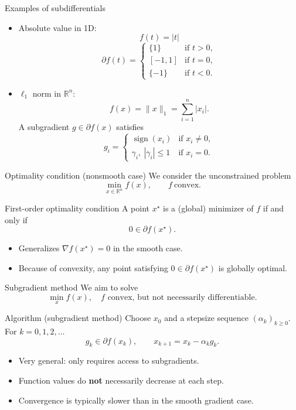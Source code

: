 \documentclass[aspectratio=169]{beamer}
\begin{document}
\begin{frame}{Examples of subdifferentials}
\begin{itemize}
    \item Absolute value in 1D:
    \[
    f(t) = |t|
    \]
    \[
    \partial f(t) =
    \begin{cases}
        \{1\}  & \text{if } t>0,\\
        [-1,1] & \text{if } t=0,\\
        \{-1\} & \text{if } t<0.
    \end{cases}
    \]
    \item $\ell_1$ norm in $\mathbb{R}^n$:
    \[
    f(x) = \|x\|_1 = \sum_{i=1}^n |x_i|.
    \]
    A subgradient $g\in\partial f(x)$ satisfies
    \[
    g_i =
    \begin{cases}
        \operatorname{sign}(x_i) & \text{if } x_i\neq 0,\\
        \gamma_i, \ |\gamma_i|\le 1 & \text{if } x_i=0.
    \end{cases}
    \]
\end{itemize}
\end{frame}


\begin{frame}{Optimality condition (nonsmooth case)}
We consider the unconstrained problem
\[
\min_{x\in\mathbb{R}^n} f(x), \qquad f\ \text{convex}.
\]
\pause
\begin{block}{First-order optimality condition}
A point $x^\star$ is a (global) minimizer of $f$ if and only if
\[
0 \in \partial f(x^\star).
\]
\end{block}
\pause
\begin{itemize}
    \item Generalizes $\nabla f(x^\star)=0$ in the smooth case.
    \item Because of convexity, any point satisfying $0\in \partial f(x^\star)$ is globally optimal.
\end{itemize}
\end{frame}


\begin{frame}{Subgradient method}
We aim to solve
\[
\min_x f(x), \quad f \text{ convex, but not necessarily differentiable}.
\]
\pause
\begin{block}{Algorithm (subgradient method)}
Choose $x_0$ and a stepsize sequence $(\alpha_k)_{k\ge 0}$.  
For $k=0,1,2,\dots$
\[
g_k \in \partial f(x_k),
\qquad
x_{k+1} = x_k - \alpha_k g_k.
\]
\end{block}
\pause
\begin{itemize}
    \item Very general: only requires access to subgradients.
    \item Function values do \textbf{not} necessarily decrease at each step.
    \item Convergence is typically slower than in the smooth gradient case.
\end{itemize}
\end{frame}
\end{document}
